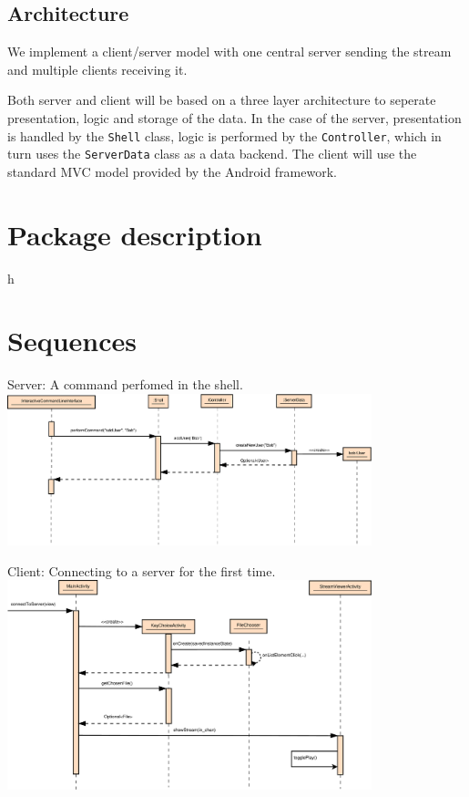 \documentclass[a4paper,10pt]{scrartcl}
\begin{document}
\subsection{Architecture}

We implement a client/server model with one central server sending the stream and multiple clients
receiving it.



Both server and client will be based on a three layer architecture to seperate presentation, logic
and storage of the data.
In the case of the server, presentation is handled by the \lstinline|Shell| class, logic is
performed by the \lstinline|Controller|, which in turn uses the \lstinline|ServerData| class
as a data backend.
The client will use the standard MVC model provided by the Android framework.



\section{Package description}




h




\section{Sequences}
\begin{illustration}{Server: A command perfomed in the shell.}
\includegraphics [width=400px] {figures/sequence_diagram_server/Server1.pdf}
\end{illustration}
\begin{illustration}{Client: Connecting to a server for the first time.}
\includegraphics [width=400px] {figures/sequence_diagram_client/sequence_client.pdf}
\end{illustration}
\end{document}
